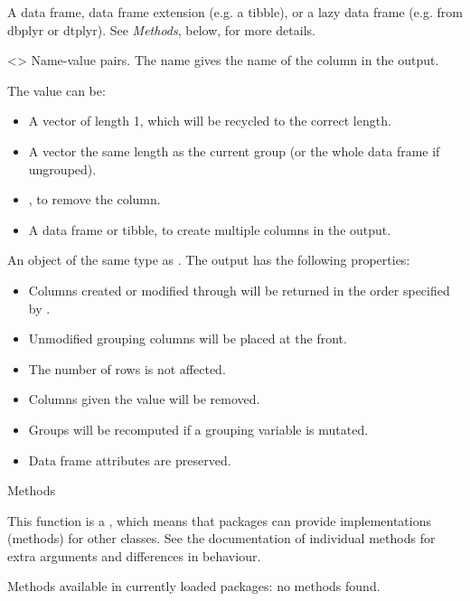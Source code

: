 \documentclass[a4paper]{book}
\begin{document}
\begin{Arguments}
\begin{ldescription}
\item[\code{.data}] A data frame, data frame extension (e.g. a tibble), or a
lazy data frame (e.g. from dbplyr or dtplyr). See \emph{Methods}, below, for
more details.

\item[\code{...}] <> Name-value pairs.
The name gives the name of the column in the output.

The value can be:
\begin{itemize}

\item{} A vector of length 1, which will be recycled to the correct length.
\item{} A vector the same length as the current group (or the whole data frame
if ungrouped).
\item{} , to remove the column.
\item{} A data frame or tibble, to create multiple columns in the output.

\end{itemize}

\end{ldescription}
\end{Arguments}
%
\begin{Value}
An object of the same type as . The output has the following
properties:
\begin{itemize}

\item{} Columns created or modified through  will be returned in the order
specified by .
\item{} Unmodified grouping columns will be placed at the front.
\item{} The number of rows is not affected.
\item{} Columns given the value  will be removed.
\item{} Groups will be recomputed if a grouping variable is mutated.
\item{} Data frame attributes are preserved.

\end{itemize}

\end{Value}
%
\begin{Section}{Methods}

This function is a , which means that packages can provide
implementations (methods) for other classes. See the documentation of
individual methods for extra arguments and differences in behaviour.

Methods available in currently loaded packages:
no methods found.
\end{Section}
\end{document}
